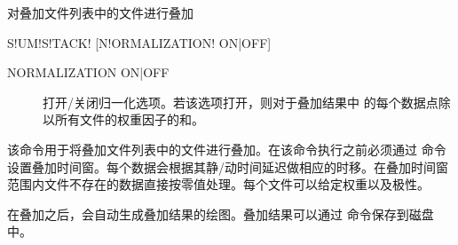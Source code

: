 \label{sss:sumstack}

对叠加文件列表中的文件进行叠加

\begin{SACSTX}
S!UM!S!TACK! [N!ORMALIZATION! ON|OFF]
\end{SACSTX}

\begin{description}
\item [NORMALIZATION ON|OFF] 打开/关闭归一化选项。若该选项打开，则对于叠加结果中
的每个数据点除以所有文件的权重因子的和。
\end{description}

该命令用于将叠加文件列表中的文件进行叠加。在该命令执行之前必须通过  命令设置叠加时间窗。每个数据会根据其静/动时间延迟做相应的时移。在叠加时间窗范围内文件不存在的数据直接按零值处理。每个文件可以给定权重以及极性。

在叠加之后，会自动生成叠加结果的绘图。叠加结果可以通过  命令保存到磁盘中。
